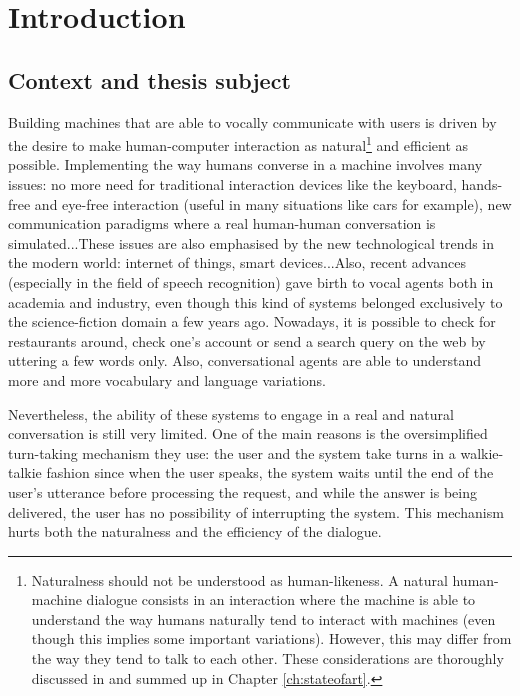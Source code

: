 \chapter*{Introduction}

\section*{Context and thesis subject}

				Building machines that are able to vocally communicate with users is driven by the desire to make human-computer interaction as natural\footnote{Naturalness should not be understood as human-likeness. A natural human-machine dialogue consists in an interaction where the machine is able to understand the way humans naturally tend to interact with machines (even though this implies some important variations). However, this may differ from the way they tend to talk to each other. These considerations are thoroughly discussed in \cite{Edlund2008} and summed up in Chapter \ref{ch:stateofart}.} and efficient as possible. Implementing the way humans converse in a machine involves many issues: no more need for traditional interaction devices like the keyboard, hands-free and eye-free interaction (useful in many situations like cars for example), new communication paradigms where a real human-human conversation is simulated...These issues are also emphasised by the new technological trends in the modern world: internet of things, smart devices...Also, recent advances (especially in the field of speech recognition) gave birth to vocal agents both in academia and industry, even though this kind of systems belonged exclusively to the science-fiction domain a few years ago. Nowadays, it is possible to check for restaurants around, check one's account or send a search query on the web by uttering a few words only. Also, conversational agents are able to understand more and more vocabulary and language variations.
				
				Nevertheless, the ability of these systems to engage in a real and natural conversation is still very limited. One of the main reasons is the oversimplified turn-taking mechanism they use: the user and the system take turns in a walkie-talkie fashion since when the user speaks, the system waits until the end of the user's utterance before processing the request, and while the answer is being delivered, the user has no possibility of interrupting the system. This mechanism hurts both the naturalness and the efficiency of the dialogue.
				
